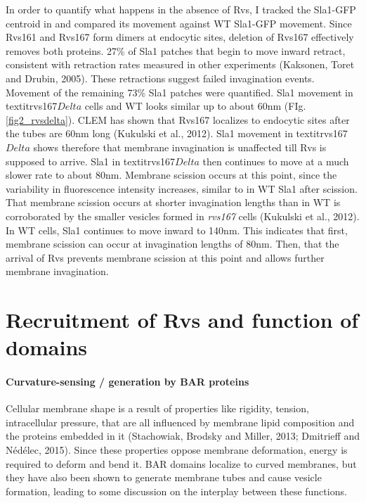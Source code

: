 In order to quantify what happens in the absence of Rvs, I tracked the Sla1-GFP centroid in and compared its movement against WT Sla1-GFP movement. Since Rvs161 and Rvs167 form dimers at endocytic sites, deletion of Rvs167 effectively removes both proteins. 27\% of Sla1 patches that begin to move inward retract, consistent with retraction rates measured in other experiments (Kaksonen, Toret and Drubin, 2005). These retractions suggest failed invagination events. Movement of the remaining 73\% Sla1 patches were quantified. Sla1 movement in textit{rvs167\text$Delta$} cells and WT looks similar up to about 60nm (FIg.\ref{fig2_rvsdelta}). 
CLEM has shown that Rvs167 localizes to endocytic sites after the tubes are 60nm long (Kukulski et al., 2012). Sla1 movement in textit{rvs167\text$Delta$} shows therefore that membrane invagination is unaffected till Rvs is supposed to arrive. Sla1 in textit{rvs167\text$Delta$} then continues to move at a much slower rate to about 80nm. Membrane scission occurs at this point, since the variability in fluorescence intensity increases, similar to in WT Sla1 after scission. That membrane scission occurs at shorter invagination lengths than in WT is corroborated by the smaller vesicles formed in \textit{rvs167\textDelta} cells (Kukulski et al., 2012). In WT cells, Sla1 continues to move inward to 140nm. This indicates that first, membrane scission can occur at invagination lengths of 80nm. Then, that the arrival of Rvs prevents membrane scission at this point and allows further membrane invagination. 





\section{Recruitment of Rvs and function of domains} 

	\paragraph{Curvature-sensing / generation by BAR proteins }
Cellular membrane shape is a result of properties like rigidity, tension, intracellular pressure, that are all influenced by membrane lipid composition and the proteins embedded in it (Stachowiak, Brodsky and Miller, 2013; Dmitrieff and Nédélec, 2015). Since these properties oppose membrane deformation, energy is required to deform and bend it. BAR domains localize to curved membranes, but they have also been shown to generate membrane tubes and cause vesicle formation, leading to some discussion on the interplay between these functions. 


